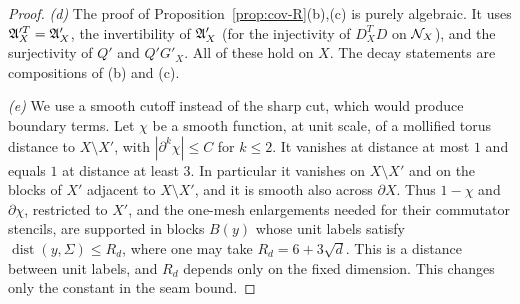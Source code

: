 \begin{proof}
\emph{(d)} The proof of Proposition~\ref{prop:cov-R}(b),(c) is purely algebraic. It uses $\mathfrak A'^T_X=\mathfrak A'_X$, the invertibility of $\mathfrak A'_X$ (for the injectivity of $D^T_XD$ on $\mathcal N_X$), and the surjectivity of $Q'$ and $Q'G'_X$. All of these hold on $X$. The decay statements are compositions of (b) and (c).

\emph{(e)} We use a smooth cutoff instead of the sharp cut, which would produce boundary terms. Let $\chi$ be a smooth function, at unit scale, of a mollified torus distance to $X\setminus X'$, with $|\partial^k\chi|\le C$ for $k\le2$. It vanishes at distance at most $1$ and equals $1$ at distance at least $3$. In particular it vanishes on $X\setminus X'$ and on the blocks of $X'$ adjacent to $X\setminus X'$, and it is smooth also across $\partial X$. Thus $1-\chi$ and $\partial\chi$, restricted to $X'$, and the one-mesh enlargements needed for their commutator stencils, are supported in blocks $B(y)$ whose unit labels satisfy $\operatorname{dist}(y,\Sigma)\le R_d$, where one may take $R_d=6+3\sqrt d$. This is a distance between unit labels, and $R_d$ depends only on the fixed dimension. This changes only the constant in the seam bound.


\end{proof}
